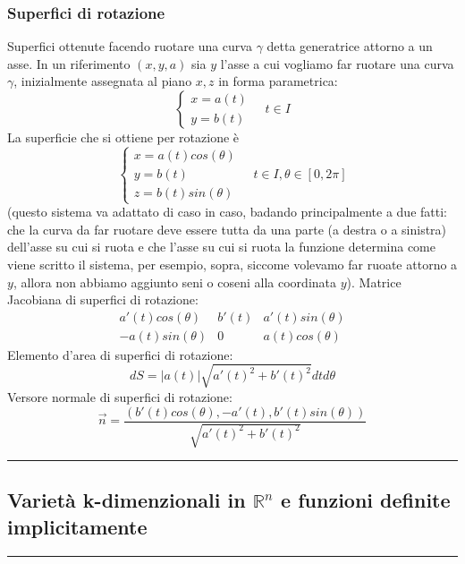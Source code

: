 \subsubsection{Superfici di rotazione}
\begin{tcolorbox}
Superfici ottenute facendo ruotare una curva $\gamma$ detta generatrice attorno a un asse.\newline
In un riferimento $(x,y,a)$ sia $y$ l'asse a cui vogliamo far ruotare una curva $\gamma$, inizialmente assegnata al piano $x, z$ in forma parametrica:
\[
    \begin{cases}
        x = a(t)\\
        y = b(t)
    \end{cases} \quad t \in I
\]
La superficie che si ottiene per rotazione è
\[
    \begin{cases}
        x= a(t) cos(\theta)\\
        y = b(t)\\
        z= b(t) sin(\theta)
    \end{cases} \quad t \in I, \theta \in[0,2\pi]
\]
(questo sistema va adattato di caso in caso, badando principalmente a due fatti: che la curva da far ruotare deve essere tutta da una parte (a destra o a sinistra) dell'asse su cui si ruota e che l'asse su cui si ruota la funzione determina come viene scritto il sistema, per esempio, sopra, siccome volevamo far ruoate attorno a $y$, allora non abbiamo aggiunto seni o coseni alla coordinata $y$).\newline
Matrice Jacobiana di superfici di rotazione:
\[
    \begin{matrix}
        a'(t)cos(\theta) & b'(t) & a'(t)sin(\theta)\\
        -a(t)sin(\theta) & 0 & a(t) cos(\theta) 
    \end{matrix}
\]
Elemento d'area di superfici di rotazione:
\[
    dS = |a(t)|\sqrt{a'(t)^2 + b'(t)^2} dt d \theta
\]
Versore normale di superfici di rotazione:
\[
    \vec{n} = \frac{ (b'(t)cos(\theta), -a'(t), b'(t)sin(\theta))}{\sqrt{a'(t)^2 + b'(t)^2}}
\]
\end{tcolorbox}
\rule{\textwidth}{2pt}
\subsection{Varietà k-dimenzionali in $\mathbb{R}^n$ e funzioni definite implicitamente}
\rule{\textwidth}{0,4pt}
